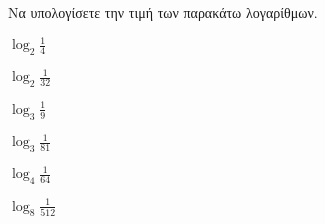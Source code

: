 Να υπολογίσετε την τιμή των παρακάτω λογαρίθμων.
\begin{multicols}{3}
\begin{rlist}
\item $ \log_{2}{\frac{1}{4}} $
\item $ \log_{2}{\frac{1}{32}} $
\item $ \log_{3}{\frac{1}{9}} $
\item $ \log_{3}{\frac{1}{81}} $
\item $ \log_{4}{\frac{1}{64}} $
\item $ \log_{8}{\frac{1}{512}} $
\end{rlist}
\end{multicols}
